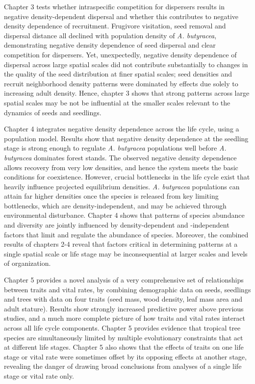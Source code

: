 \documentclass[b5paper,justified]{tufte-book} %
\begin{document}
\begin{fullwidth}
Chapter 3 tests whether intraspecific competition for dispersers results in negative density-dependent dispersal and whether this contributes to negative density dependence of recruitment. Frugivore visitation, seed removal and dispersal distance all declined with population density of \textit{A. butyracea}, demonstrating negative density dependence of seed dispersal and clear competition for dispersers.  Yet, unexpectedly, negative density dependence of dispersal across large spatial scales did not contribute substantially to changes in the quality of the seed distribution at finer spatial scales; seed densities and recruit neighborhood density patterns were dominated by effects due solely to increasing adult density. Hence, chapter 3 shows that strong patterns across large spatial scales may be not be influential at the smaller scales relevant to the dynamics of seeds and seedlings.

Chapter 4 integrates negative density dependence across the life cycle, using a population model. Results show that negative density dependence at the seedling stage is strong enough to regulate \textit{A. butyracea} populations well before \textit{A. butyracea} dominates forest stands. The observed negative density dependence allows recovery from very low densities, and hence the system meets the basic conditions for coexistence.  However, crucial bottlenecks in the life cycle exist that heavily influence projected equilibrium densities. \textit{A. butyracea} populations can attain far higher densities once the species is released from key limiting bottlenecks, which are density-independent, and may be achieved through environmental disturbance. Chapter 4 shows that patterns of species abundance and diversity are jointly influenced by density-dependent and -independent factors that limit and regulate the abundance of species. Moreover, the combined results of chapters 2-4 reveal that factors critical in determining patterns at a single spatial scale or life stage may be inconsequential at larger scales and levels of organization.

Chapter 5 provides a novel analysis of a very comprehensive set of relationships between traits and vital rates, by combining demographic data on seeds, seedlings and trees with data on four traits (seed mass, wood density, leaf mass area and adult stature). Results show strongly increased predictive power above previous studies, and a much more complete picture of how traits and vital rates interact across all life cycle components. Chapter 5 provides evidence that tropical tree species are simultaneously limited by multiple evolutionary constraints that act at different life stages.  Chapter 5 also shows that the effects of traits on one life stage or vital rate were sometimes offset by its opposing effects at another stage, revealing the danger of drawing broad conclusions from analyses of a single life stage or vital rate only.


\end{fullwidth}
\end{document}
